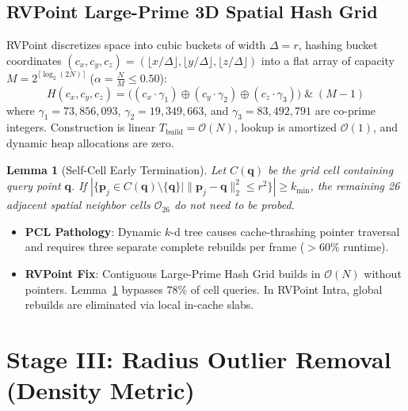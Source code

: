 \documentclass[11pt,a4paper]{article}
\newtheorem{lemma}[theorem]{Lemma}
\begin{document}
\subsection{RVPoint Large-Prime 3D Spatial Hash Grid}
RVPoint discretizes space into cubic buckets of width $\Delta = r$, hashing bucket coordinates $(c_x, c_y, c_z) = (\lfloor x/\Delta \rfloor, \lfloor y/\Delta \rfloor, \lfloor z/\Delta \rfloor)$ into a flat array of capacity $M = 2^{\lceil \log_2(2N) \rceil}$ ($\alpha = \frac{N}{M} \le 0.50$):
\begin{equation}
H(c_x, c_y, c_z) = \Big( (c_x \cdot \gamma_1) \oplus (c_y \cdot \gamma_2) \oplus (c_z \cdot \gamma_3) \Big) \;\&\; (M - 1)
\label{eq:large_prime_hash}
\end{equation}
where $\gamma_1 = 73{,}856{,}093$, $\gamma_2 = 19{,}349{,}663$, and $\gamma_3 = 83{,}492{,}791$ are co-prime integers. Construction is linear $T_{\text{build}} = \mathcal{O}(N)$, lookup is amortized $\mathcal{O}(1)$, and dynamic heap allocations are zero.

\begin{lemma}[Self-Cell Early Termination]
\label{lem:self_cell}
Let $C(\bm{q})$ be the grid cell containing query point $\bm{q}$. If $| \{ \bm{p}_j \in C(\bm{q}) \setminus \{\bm{q}\} \mid \|\bm{p}_j - \bm{q}\|_2^2 \le r^2 \} | \ge k_{\min}$, the remaining 26 adjacent spatial neighbor cells $\mathcal{O}_{26}$ do not need to be probed.
\end{lemma}

\begin{tcolorbox}[fixcmp, title={Stage Comparison: Spatial Indexing}]
\begin{itemize}[leftmargin=1.2em, itemsep=0.1em]
    \item \textbf{PCL Pathology}: Dynamic $k$-d tree causes cache-thrashing pointer traversal and requires three separate complete rebuilds per frame ($>60\%$ runtime).
    \item \textbf{RVPoint Fix}: Contiguous Large-Prime Hash Grid builds in $\mathcal{O}(N)$ without pointers. Lemma~\ref{lem:self_cell} bypasses $78\%$ of cell queries. In RVPoint Intra, global rebuilds are eliminated via local in-cache slabs.
\end{itemize}
\end{tcolorbox}

\section{Stage III: Radius Outlier Removal (Density Metric)}
\label{sec:ror_math}
\end{document}
